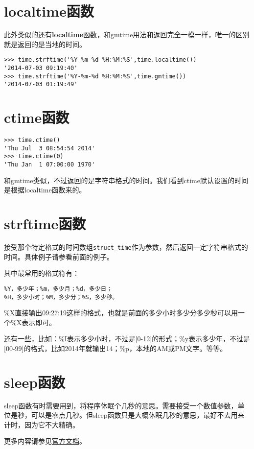 \documentclass[12pt,oneside]{book}
\begin{document}
\begin{common-format}
\section{localtime函数}
此外类似的还有\textbf{localtime}函数，和gmtime用法和返回完全一模一样，唯一的区别就是返回的是当地的时间。
\begin{Verbatim}
>>> time.strftime('%Y-%m-%d %H:%M:%S',time.localtime())
'2014-07-03 09:19:40'
>>> time.strftime('%Y-%m-%d %H:%M:%S',time.gmtime())
'2014-07-03 01:19:49'
\end{Verbatim}


\section{ctime函数}
\begin{Verbatim}
>>> time.ctime()
'Thu Jul  3 08:54:54 2014'
>>> time.ctime(0)
'Thu Jan  1 07:00:00 1970'
\end{Verbatim}
和gmtime类似，不过返回的是字符串格式的时间。我们看到ctime默认设置的时间是根据localtime函数来的。


\section{strftime函数}
接受那个特定格式的时间数组\verb+struct_time+作为参数，然后返回一定字符串格式的时间。具体例子请参看前面的例子。

其中最常用的格式符有：
\begin{Verbatim}
%Y，多少年；%m，多少月；%d，多少日；
%H，多少小时；%M，多少分；%S，多少秒。
\end{Verbatim}

\%{}X直接输出09:27:19这样的格式，也就是前面的多少小时多少分多少秒可以用一个\%{}X表示即可。

还有一些，比如：\%{}I表示多少小时，不过是[0-12]的形式；\%{}y表示多少年，不过是[00-99]的格式，比如2014年就输出14；\%{}p，本地的AM或PM文字。等等。


\section{sleep函数 }
sleep函数有时需要用到，将程序休眠个几秒的意思。需要接受一个数值参数，单位是秒，可以是零点几秒。但sleep函数只是大概休眠几秒的意思，最好不去用来计时，因为它不大精确。


\begin{Large}
更多内容请参见\href{https://docs.python.org/3/library/time.html}{官方文档}。
\end{Large}


\end{common-format}
\end{document}
